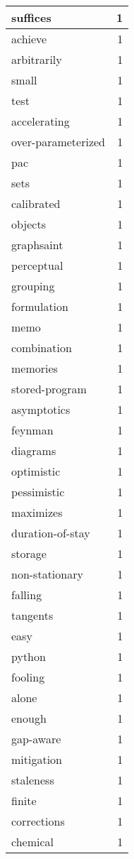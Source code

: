 \begin{table}[h]
\begin{tabular}{|l|r|}
\hline
suffices & 1 \\
\hline
achieve & 1 \\
\hline
arbitrarily & 1 \\
\hline
small & 1 \\
\hline
test & 1 \\
\hline
accelerating & 1 \\
\hline
over-parameterized & 1 \\
\hline
pac & 1 \\
\hline
sets & 1 \\
\hline
calibrated & 1 \\
\hline
objects & 1 \\
\hline
graphsaint & 1 \\
\hline
perceptual & 1 \\
\hline
grouping & 1 \\
\hline
formulation & 1 \\
\hline
memo & 1 \\
\hline
combination & 1 \\
\hline
memories & 1 \\
\hline
stored-program & 1 \\
\hline
asymptotics & 1 \\
\hline
feynman & 1 \\
\hline
diagrams & 1 \\
\hline
optimistic & 1 \\
\hline
pessimistic & 1 \\
\hline
maximizes & 1 \\
\hline
duration-of-stay & 1 \\
\hline
storage & 1 \\
\hline
non-stationary & 1 \\
\hline
falling & 1 \\
\hline
tangents & 1 \\
\hline
easy & 1 \\
\hline
python & 1 \\
\hline
fooling & 1 \\
\hline
alone & 1 \\
\hline
enough & 1 \\
\hline
gap-aware & 1 \\
\hline
mitigation & 1 \\
\hline
staleness & 1 \\
\hline
finite & 1 \\
\hline
corrections & 1 \\
\hline
chemical & 1 \\

\end{tabular}
\end{table}
